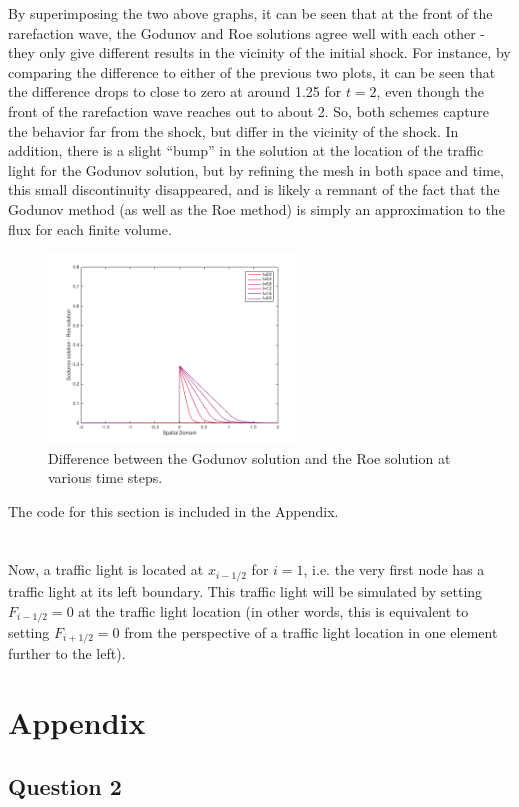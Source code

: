 \documentclass[10pt]{article}
\begin{document}
By superimposing the two above graphs, it can be seen that at the front of the rarefaction wave, the Godunov and Roe solutions agree well with each other - they only give different results in the vicinity of the initial shock. For instance, by comparing the difference to either of the previous two plots, it can be seen that the difference drops to close to zero at around 1.25 for \(t=2\), even though the front of the rarefaction wave reaches out to about 2. So, both schemes capture the behavior far from the shock, but differ in the vicinity of the shock. In addition, there is a slight ``bump'' in the solution at the location of the traffic light for the Godunov solution, but by refining the mesh in both space and time, this small discontinuity disappeared, and is likely a remnant of the fact that the Godunov method (as well as the Roe method) is simply an approximation to the flux for each finite volume. 

\begin{figure}[H]
\centering
\includegraphics[width=0.6\textwidth]{figures/difference1.png}
\caption{Difference between the Godunov solution and the Roe solution at various time steps.}
\end{figure}

The code for this section is included in the Appendix.

\section{}
Now, a traffic light is located at \(x_{i-1/2}\) for \(i=1\), i.e. the very first node has a traffic light at its left boundary. This traffic light will be simulated by setting \(F_{i-1/2}=0\) at the traffic light location (in other words, this is equivalent to setting \(F_{i+1/2}=0\) from the perspective of a traffic light location in one element further to the left). 





\section{Appendix}
\subsection{Question 2}
%
\end{document}
